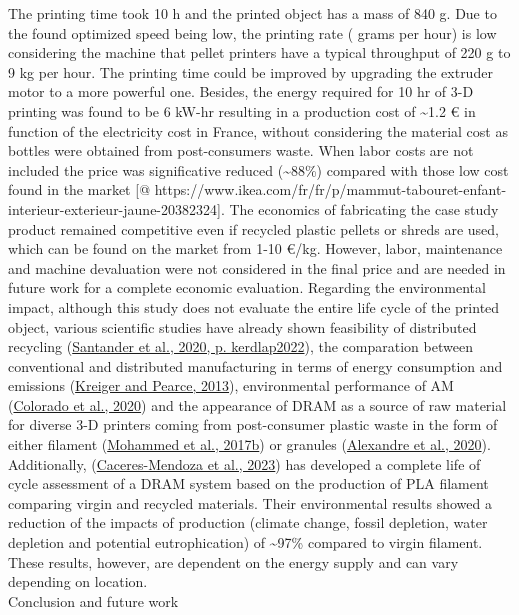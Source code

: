 \documentclass[
  12pt,
  number,
  review]{elsarticle}
\begin{document}
The printing time took 10 h and the printed object has a mass of 840 g.
Due to the found optimized speed being low, the printing rate ( grams
per hour) is low considering the machine that pellet printers have a
typical throughput of 220 g to 9 kg per hour. The printing time could be
improved by upgrading the extruder motor to a more powerful one.
Besides, the energy required for 10 hr of 3-D printing was found to be 6
kW-hr resulting in a production cost of \textasciitilde1.2 € in function
of the electricity cost in France, without considering the material cost
as bottles were obtained from post-consumers waste. When labor costs are
not included the price was significative reduced (\textasciitilde88\%)
compared with those low cost found in the market {[}@
https://www.ikea.com/fr/fr/p/mammut-tabouret-enfant-interieur-exterieur-jaune-20382324{]}.
The economics of fabricating the case study product remained competitive
even if recycled plastic pellets or shreds are used, which can be found
on the market from 1-10 €/kg. However, labor, maintenance and machine
devaluation were not considered in the final price and are needed in
future work for a complete economic evaluation. Regarding the
environmental impact, although this study does not evaluate the entire
life cycle of the printed object, various scientific studies have
already shown feasibility of distributed recycling
(\protect\hyperlink{ref-santander2020}{Santander et al., 2020, p.
kerdlap2022}), the comparation between conventional and distributed
manufacturing in terms of energy consumption and emissions
(\protect\hyperlink{ref-Kreiger2013}{Kreiger and Pearce, 2013}),
environmental performance of AM
(\protect\hyperlink{ref-colorado2020a}{Colorado et al., 2020}) and the
appearance of DRAM as a source of raw material for diverse 3-D printers
coming from post-consumer plastic waste in the form of either filament
(\protect\hyperlink{ref-mohammed2017a}{Mohammed et al., 2017b}) or
granules (\protect\hyperlink{ref-alexandre2020}{Alexandre et al.,
2020}). Additionally,
(\protect\hyperlink{ref-caceres-mendoza2023}{Caceres-Mendoza et al.,
2023}) has developed a complete life of cycle assessment of a DRAM
system based on the production of PLA filament comparing virgin and
recycled materials. Their environmental results showed a reduction of
the impacts of production (climate change, fossil depletion, water
depletion and potential eutrophication) of \textasciitilde97\% compared
to virgin filament. These results, however, are dependent on the energy
supply and can vary depending on location.\\
Conclusion and future work
\end{document}
